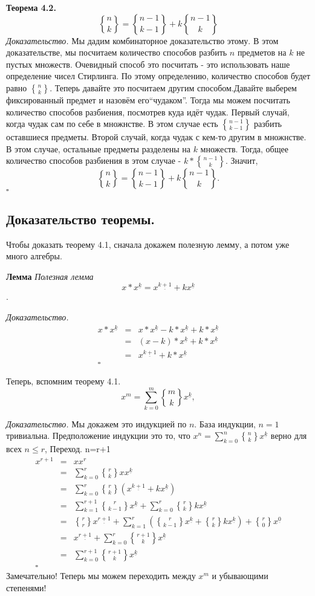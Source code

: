 \documentclass{article}
\newcommand{\ff}[1]{%
  ^{\underline{#1}}%
}
\DeclareRobustCommand{\stirling}{\genfrac\{\}{0pt}{}}
\begin{document}
\textbf{Теорема 4.2.}
$$\stirling{n}{k}=\stirling{n-1}{k-1}+k\stirling{n-1}{k}$$
\textit{Доказательство.} Мы дадим комбинаторное доказательство этому. В этом доказательстве, мы посчитаем количество способов разбить $n$ предметов на $k$ не пустых множеств.
Очевидный способ это посчитать - это использовать наше определение чисел Стирлинга. По этому определению, количество способов будет равно $\stirling{n}{k}$.
Теперь давайте это посчитаем другим способом.Давайте выберем фиксированный предмет и назовём его``чудаком''. Тогда мы можем посчитать количество способов разбиения, посмотрев куда идёт чудак. Первый случай, когда чудак сам по себе в множнстве. В этом случае есть $\stirling{n-1}{k-1}$ разбить оставшиеся предметы. Второй случай, когда чудак с кем-то другим в множнстве. В этом случае, остальные предметы разделены на $k$  множеств. Тогда, общее количество способов разбиения в этом случае - $k*\stirling{n-1}{k}$.
Значит,
$$\stirling{n}{k}=\stirling{n-1}{k-1}+k\stirling{n-1}{k}.$$
$\square$
\subsection{Доказательство теоремы.}
Чтобы доказать теорему 4.1, сначала докажем полезную лемму, а потом уже много алгебры.

\textbf{Лемма} \textit{Полезная лемма}
$$x*x\ff{k}=x\ff{k+1}+kx\ff{k}$$.

\textit{Доказательство.}
\begin{eqnarray*}
x*x\ff{k} &=& x*x\ff{k}-k*x\ff{k}+k*x\ff{k} \\
&=& (x-k)*x\ff{k}+k*x\ff{k} \\
&=& x\ff{k+1}+k*x\ff{k} \\
\square
\end{eqnarray*}

Теперь, вспомним теорему 4.1.
$$x^m=\sum_{k=0}^m \stirling{m}{k} x\ff{k},$$

\textit{Доказательство.} Мы докажем это индукцией по $n$.
База индукции, $n=1$ тривиальна.
Предположение индукции это то, что $x^n=\sum_{k=0}^n \stirling{n}{k} x\ff{k}$ верно для всех $n \leq r$,
Переход. n=r+1
\begin{eqnarray*}
x^{r+1} &=& xx^r \\
&=& \sum_{k=0}^r \stirling{r}{k} xx\ff{k} \\
&=& \sum_{k=0}^r \stirling{r}{k} (x\ff{k+1}+kx\ff{k}) \\
&=& \sum_{k=1}^{r+1} \stirling{r}{k-1} x\ff{k} + \sum_{k=0}^r \stirling{r}{k} kx\ff{k} \\
&=& \stirling{r}{r}x\ff{r+1}+\sum_{k=1}^r(\stirling{r}{k-1}x\ff{k}+\stirling{r}{k}kx\ff{k})+\stirling{r}{0}x\ff{0} \\
&=& x\ff{r+1} + \sum_{k=0}^r \stirling{r+1}{k}x\ff{k} \\
&=& \sum_{k=0}^{r+1} \stirling{r+1}{k} x\ff{k} \\
\square
\end{eqnarray*}
Замечательно! Теперь мы можем переходить между $x^m$ и убывающими степенями!
\end{document}
